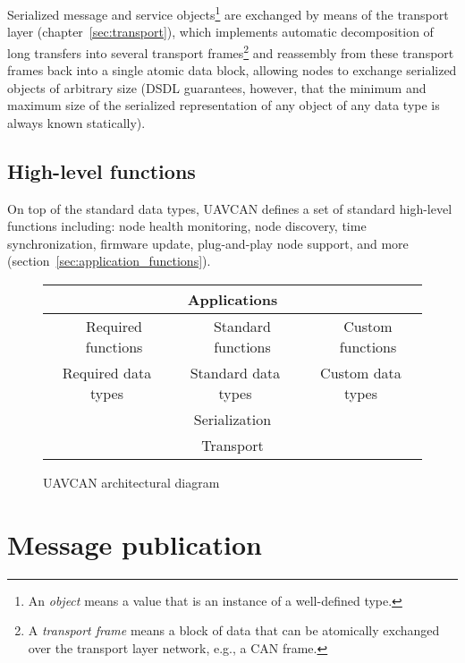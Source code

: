 Serialized message and service objects\footnote{%
    An \emph{object} means a value that is an instance of a well-defined type.
}
are exchanged by means of the transport layer (chapter~\ref{sec:transport}),
which implements automatic decomposition of long transfers into several transport frames\footnote{%
    A \emph{transport frame} means a block of data that can be atomically exchanged over the transport layer network,
    e.g., a CAN frame.
} and reassembly from these transport frames
back into a single atomic data block, allowing nodes to exchange serialized objects of
arbitrary size (DSDL guarantees, however, that the minimum and maximum size of the serialized representation
of any object of any data type is always known statically).

\subsection{High-level functions}

On top of the standard data types, UAVCAN defines a set of standard high-level functions including:
node health monitoring, node discovery, time synchronization, firmware update,
plug-and-play node support, and more (section~\ref{sec:application_functions}).

\begin{figure}[hbt]
    \centering
    \begin{tabular}{|c|c|l|c|l|c|}
        \hline
        \multicolumn{6}{|c|}{Applications} \\ \hline

        \qquad{} & Required functions &
        \qquad{} & Standard functions &
        \qquad{} & Custom functions \\
        \cline{2-2} \cline{4-4} \cline{6-6}

        \multicolumn{2}{|c|}{Required data types} &
        \multicolumn{2}{c|}{Standard data types} &
        \multicolumn{2}{c|}{Custom data types} \\ \hline

        \multicolumn{6}{|c|}{Serialization} \\ \hline

        \multicolumn{6}{|c|}{Transport} \\ \hline
    \end{tabular}
    \caption{UAVCAN architectural diagram\label{fig:basic_architecture}}
\end{figure}

\section{Message publication}

